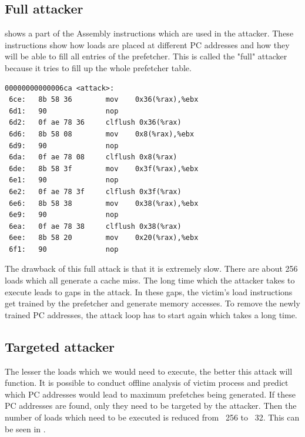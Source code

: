 \subsection{Full attacker}

 shows a part of the Assembly instructions
which are used in the attacker. These instructions show how loads are
placed at different PC addresses and how they will be able to fill
all entries of the prefetcher. This is called the "full" attacker because
it tries to fill up the whole prefetcher table.

\begin{lstlisting}[caption={Assembly showing load misses at different PCs},
label={lst:full_attack}]
00000000000006ca <attack>:
 6ce:   8b 58 36        mov    0x36(%rax),%ebx
 6d1:   90              nop
 6d2:   0f ae 78 36     clflush 0x36(%rax)
 6d6:   8b 58 08        mov    0x8(%rax),%ebx
 6d9:   90              nop
 6da:   0f ae 78 08     clflush 0x8(%rax)
 6de:   8b 58 3f        mov    0x3f(%rax),%ebx
 6e1:   90              nop
 6e2:   0f ae 78 3f     clflush 0x3f(%rax)
 6e6:   8b 58 38        mov    0x38(%rax),%ebx
 6e9:   90              nop
 6ea:   0f ae 78 38     clflush 0x38(%rax)
 6ee:   8b 58 20        mov    0x20(%rax),%ebx
 6f1:   90              nop
\end{lstlisting}

The drawback of this full attack is that it is extremely slow. There are about
256 loads which all generate a cache miss. The long time which the attacker
takes to execute leads to gaps in the attack. In these gaps, the victim's
load instructions get trained by the
prefetcher and generate memory accesses. To remove the newly trained PC addresses,
the attack loop has to start again which takes a long time.

\subsection{Targeted attacker}

The lesser the loads which we would need to execute, the better this attack will
function. It is possible to conduct offline analysis of victim process
and predict which PC addresses would lead to maximum prefetches being generated.
If these PC addresses are found, only they need to be targeted by the attacker.
Then the number of loads which need to be executed is reduced from ~256 to ~32.
This can be seen in .

